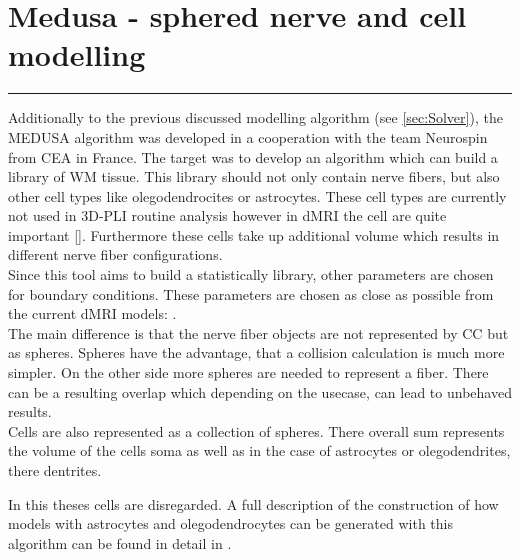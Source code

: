 \section{Medusa - sphered nerve and cell modelling}
\label{sec:medusa}
% 
% 
\par
\noindent\rule{\textwidth}{2pt}
\par
% 
Additionally to the previous discussed modelling algorithm (see \cref{sec:Solver}), the \ac{MEDUSA} algorithm \cite{Ginsburger2019} was developed in a cooperation with the team Neurospin from \ac{CEA} in France.
The target was to develop an algorithm which can build a library of \ac{WM} tissue.
This library should not only contain nerve fibers, but also other cell types like olegodendrocites or astrocytes.
These cell types are currently not used in \ac{3D-PLI} routine analysis however in \ac{dMRI} the cell are quite important [\dummy{}].
Furthermore these cells take up additional volume which results in different nerve fiber configurations.
\\
% 
Since this tool aims to build a statistically library, other parameters are chosen for boundary conditions.
These parameters are chosen as close as possible from the current \ac{dMRI} models:
\dummy{}.
\\
%
The main difference is that the nerve fiber objects are not represented by \ac{CC} but as spheres.
Spheres have the advantage, that a collision calculation is much more simpler. 
On the other side more spheres are needed to represent a fiber.
There can be a resulting overlap which depending on the usecase, can lead to unbehaved results.
\\
% 
Cells are also represented as a collection of spheres.
There overall sum represents the volume of the cells soma as well as in the case of astrocytes or olegodendrites, there dentrites.
\par
%
In this theses cells are disregarded.
A full description of the construction of how models with astrocytes and olegodendrocytes can be generated with this algorithm can be found in detail in  \cite{Ginsburger2019}.
% 

